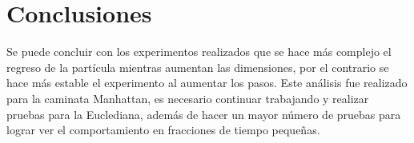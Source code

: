 \documentclass{article}
\begin{document}
\section{Conclusiones}
Se puede concluir con los experimentos realizados que se hace más complejo el regreso de la partícula mientras aumentan las dimensiones, por el contrario se hace más estable el experimento al aumentar los pasos. Este análisis fue realizado para la caminata Manhattan, es necesario continuar trabajando y realizar pruebas para la Euclediana, además de hacer un mayor número de pruebas para lograr ver el comportamiento en fracciones de tiempo pequeñas. 



\end{document}

